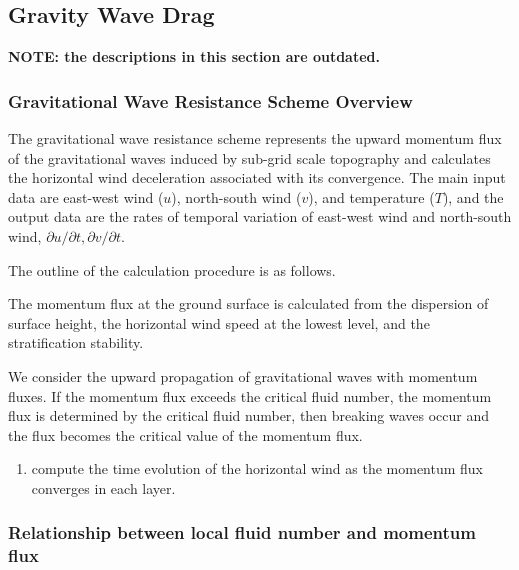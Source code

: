 \hypertarget{gravity-wave-drag}{%
\subsection{Gravity Wave Drag}\label{gravity-wave-drag}}

\textbf{NOTE: the descriptions in this section are outdated.}

\hypertarget{gravitational-wave-resistance-scheme-overview}{%
\subsubsection{Gravitational Wave Resistance Scheme
Overview}\label{gravitational-wave-resistance-scheme-overview}}

The gravitational wave resistance scheme represents the upward momentum
flux of the gravitational waves induced by sub-grid scale topography and
calculates the horizontal wind deceleration associated with its
convergence. The main input data are east-west wind (\(u\)), north-south
wind (\(v\)), and temperature (\(T\)), and the output data are the rates
of temporal variation of east-west wind and north-south wind,
\(\partial u/\partial t, \partial v/\partial t\).

The outline of the calculation procedure is as follows.

The momentum flux at the ground surface is calculated from the
dispersion of surface height, the horizontal wind speed at the lowest
level, and the stratification stability.

We consider the upward propagation of gravitational waves with momentum
fluxes. If the momentum flux exceeds the critical fluid number, the
momentum flux is determined by the critical fluid number, then breaking
waves occur and the flux becomes the critical value of the momentum
flux.

\begin{enumerate}
\def\labelenumi{\arabic{enumi}.}
\setcounter{enumi}{2}
\tightlist
\item
  compute the time evolution of the horizontal wind as the momentum flux
  converges in each layer.
\end{enumerate}

\hypertarget{relationship-between-local-fluid-number-and-momentum-flux}{%
\subsubsection{Relationship between local fluid number and momentum
flux}\label{relationship-between-local-fluid-number-and-momentum-flux}}

